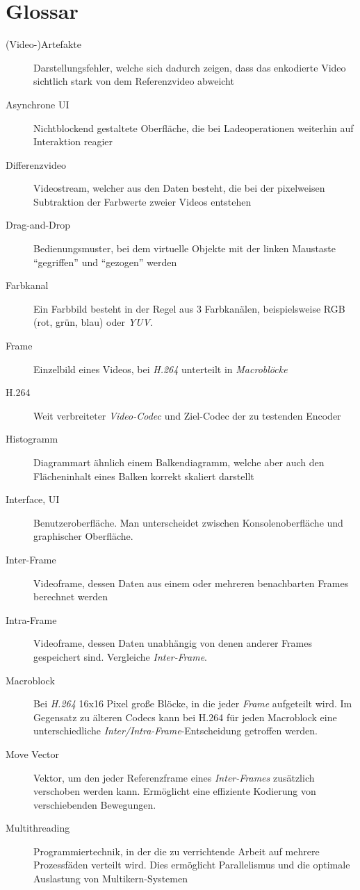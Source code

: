 \section{Glossar}

\begin{description}
    \item[(Video-)Artefakte] Darstellungsfehler, welche sich dadurch zeigen, dass das enkodierte Video sichtlich stark von dem Referenzvideo abweicht
    \item[Asynchrone UI] Nichtblockend gestaltete Oberfläche, die bei Ladeoperationen weiterhin auf Interaktion reagier

    \item[Differenzvideo] Videostream, welcher aus den Daten besteht, die bei der pixelweisen Subtraktion der Farbwerte zweier Videos entstehen
    \item[Drag-and-Drop] Bedienungsmuster, bei dem virtuelle Objekte mit der linken Maustaste ``gegriffen'' und ``gezogen'' werden

    \item[Farbkanal] Ein Farbbild besteht in der Regel aus 3 Farbkanälen, beispielsweise RGB (rot, grün, blau) oder \emph{YUV}.
    \item[Frame] Einzelbild eines Videos, bei \emph{H.264} unterteilt in \emph{Macroblöcke}

    \item[H.264] Weit verbreiteter \emph{Video-Codec} und Ziel-Codec der zu testenden Encoder
    \item[Histogramm] Diagrammart ähnlich einem Balkendiagramm, welche aber auch den Flächeninhalt eines Balken korrekt skaliert darstellt

    \item[Interface, UI] Benutzeroberfläche. Man unterscheidet zwischen Konsolenoberfläche und graphischer Oberfläche.
    \item[Inter-Frame] Videoframe, dessen Daten aus einem oder mehreren benachbarten Frames berechnet werden
    \item[Intra-Frame] Videoframe, dessen Daten unabhängig von denen anderer Frames gespeichert sind. Vergleiche \emph{Inter-Frame}.

    \item[Macroblock] Bei \emph{H.264} 16x16 Pixel große Blöcke, in die jeder \emph{Frame} aufgeteilt wird. Im Gegensatz zu älteren Codecs kann bei H.264 für jeden Macroblock eine unterschiedliche \emph{Inter/Intra-Frame}-Entscheidung getroffen werden. 
    \item[Move Vector] Vektor, um den jeder Referenzframe eines \emph{Inter-Frames} zusätzlich verschoben werden kann. Ermöglicht eine effiziente Kodierung von verschiebenden Bewegungen.
    \item[Multithreading] Programmiertechnik, in der die zu verrichtende Arbeit auf mehrere Prozessfäden verteilt wird. Dies ermöglicht Parallelismus und die optimale Auslastung von Multikern-Systemen


\end{description}
